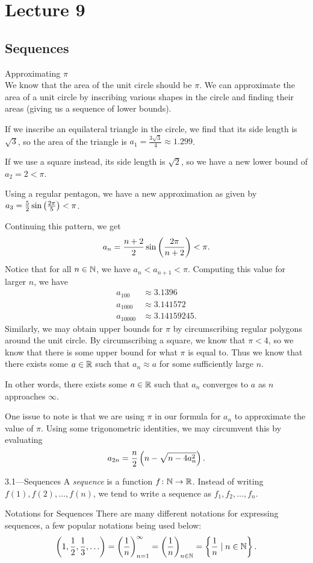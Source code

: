 \documentclass[class=article, crop=false]{standalone}
\begin{document}
  \section{Lecture 9}
  \subsection{Sequences}
  \begin{example}{Approximating $\pi$} \\
    We know that the area of the unit circle should be $\pi$. We can approximate the area of a unit circle by inscribing various shapes in the circle and finding their areas (giving us a sequence of lower bounds). \par
    If we inscribe an equilateral triangle in the circle, we find that its side length is $\sqrt{3}$, so the area of the triangle is $a_1 = \frac{3\sqrt{3}}{4}\approx 1.299$. \par
    If we use a square instead, its side length is $\sqrt{2}$, so we have a new lower bound of $a_2 = 2 < \pi$. \par
    Using a regular pentagon, we have a new approximation as given by $a_3 = \frac{5}{2}\sin \left( \frac{2\pi}{5} \right) < \pi$. \par
    Continuing this pattern, we get
    \[
      a_n = \frac{n+2}{2}\sin \left( \frac{2\pi}{n + 2} \right) < \pi.
    \]
    Notice that for all $n\in\mathbb{N}$, we have $a_n < a_{n + 1} < \pi$. Computing this value for larger $n$, we have
    \begin{align*}
      a_{100}&\approx 3.1396 \\
      a_{1000}&\approx 3.141572 \\
      a_{10000}&\approx 3.14159245.
    \end{align*}
    Similarly, we may obtain upper bounds for $\pi$ by circumscribing regular polygons around the unit circle. By circumscribing a square, we know that $\pi < 4$, so we know that there is some upper bound for what $\pi$ is equal to. Thus we know that there exists some $a\in\mathbb{R}$ such that $a_n\approx a$ for some sufficiently large $n$. \par
    In other words, there exists some $a\in\mathbb{R}$ such that $a_n$ converges to $a$ as $n$ approaches $\infty$. \par
    One issue to note is that we are using $\pi$ in our formula for $a_n$ to approximate the value of $\pi$. Using some trigonometric identities, we may circumvent this by evaluating
    \[
      a_{2n} = \frac{n}{2} \left( n - \sqrt{n - 4a_n^2} \right).
    \]
  \end{example}
  \begin{definition}{3.1---Sequences}
    A \emph{sequence} is a function $f\colon \mathbb{N}\to \mathbb{R}$. Instead of writing $f(1), f(2), \dotsc, f(n)$, we tend to write a sequence as $f_1, f_2, \dotsc, f_n$.
  \end{definition}
  \begin{note}{Notations for Sequences}
    There are many different notations for expressing sequences, a few popular notations being used below:
    \[
      \paren{1, \frac{1}{2}, \frac{1}{3}, \dotsc} = \paren{\frac{1}{n}}_{n = 1}^\infty = \paren{\frac{1}{n}}_{n\in\N} = \set{\frac{1}{n}\mid n\in\N}.
    \]
  \end{note}
\end{document}
